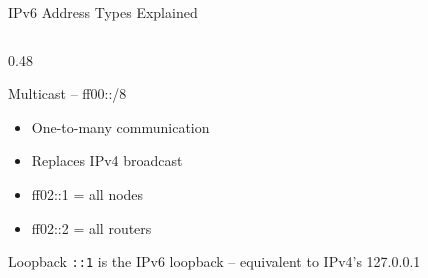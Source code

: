 \documentclass[aspectratio=169]{beamer}  %
\begin{document}
\begin{frame}[t,shrink=12]{IPv6 Address Types Explained}
\begin{columns}[T]
\begin{column}{0.48\textwidth}
            \vspace{0.2em}
            \begin{block}{Multicast -- ff00::/8}
                \small
                \begin{itemize}
                    \item One-to-many communication
                    \item Replaces IPv4 broadcast
                    \item ff02::1 = all nodes
                    \item ff02::2 = all routers
                \end{itemize}
            \end{block}
            
            \vspace{0.2em}
            \begin{exampleblock}{Loopback}
                \small
                \texttt{::1} is the IPv6 loopback -- equivalent to IPv4's 127.0.0.1
            \end{exampleblock}
        \end{column}
    \end{columns}
\end{frame}
\end{document}
